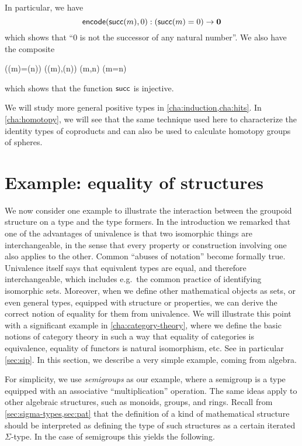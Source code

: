 In particular, we have
\begin{equation}\label{eq:zero-not-succ}
  \encode(\suc(m),0) : (\suc(m)=0) \to \emptyt
\end{equation}
which shows that ``$0$ is not the successor of any natural number''.
We also have the composite
\begin{narrowmultline}\label{eq:suc-injective}
  (\suc(m)=\suc(n))
  \xrightarrow{\encode} \narrowbreak
  \code(\suc(m),\suc(n))
  \jdeq \code(m,n) \xrightarrow{\decode} (m=n)
\end{narrowmultline}
which shows that the function $\mathsf{succ}$ is injective.
%

We will study more general positive types in \autoref{cha:induction,cha:hits}.
In \autoref{cha:homotopy}, we will see that the same technique used here to characterize the identity types of coproducts and \nat can also be used to calculate homotopy groups of spheres.

%
%

\section{Example: equality of structures}
\label{sec:equality-of-structures}

We now consider one example to illustrate the interaction between the groupoid structure on a type and the type
formers.  In the introduction we remarked that one of the
advantages of univalence is that two isomorphic things are interchangeable,
in the sense that every property or construction involving one also
applies to the other.  Common ``abuses of notation'' become formally
true.  Univalence itself says that equivalent types are equal, and
therefore interchangeable, which includes e.g.\  the common practice of identifying isomorphic sets.  Moreover, when we define other
mathematical objects as sets, or even general types, equipped with structure or properties, we
can derive the correct notion of equality for them from univalence.  We will illustrate this
point with a significant example in \cref{cha:category-theory}, where we
define the basic notions of category theory in such a way that equality
of categories is equivalence, equality of functors is natural
isomorphism, etc. See in particular \autoref{sec:sip}.
 In this section, we describe a very simple example, coming from algebra.

For simplicity, we use \emph{semigroups} as our example, where a
semigroup is a type equipped with an associative ``multiplication''
operation.  The same ideas apply to other algebraic structures, such as
monoids, groups, and rings.
Recall from \autoref{sec:sigma-types,sec:pat} that the definition of a kind of mathematical structure should be interpreted as defining the type of such structures as a certain iterated $\Sigma$-type.
In the case of semigroups this yields the following.


